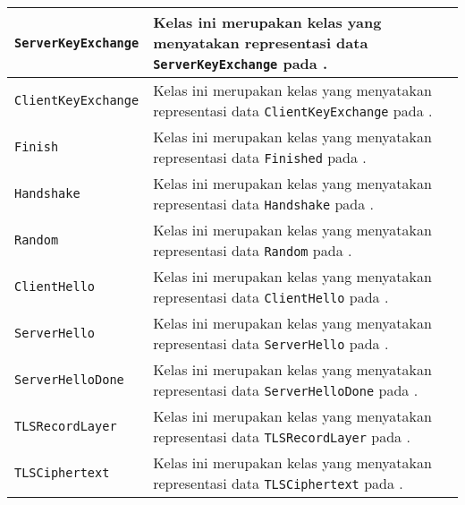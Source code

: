 \begin{longtable}{|p{3.5cm}|p{9cm}|}
    \texttt{ServerKeyExchange} & Kelas ini merupakan kelas yang menyatakan representasi data \texttt{ServerKeyExchange} pada \textcite{rfc5246}.\\ \hline
    \texttt{ClientKeyExchange} & Kelas ini merupakan kelas yang menyatakan representasi data \texttt{ClientKeyExchange} pada \textcite{rfc5246}.\\ \hline
    \texttt{Finish} & Kelas ini merupakan kelas yang menyatakan representasi data \texttt{Finished} pada \textcite{rfc5246}.\\ \hline
    \texttt{Handshake} & Kelas ini merupakan kelas yang menyatakan representasi data \texttt{Handshake} pada \textcite{rfc5246}.\\ \hline
    \texttt{Random} & Kelas ini merupakan kelas yang menyatakan representasi data \texttt{Random} pada \textcite{rfc5246}.\\ \hline
    \texttt{ClientHello} & Kelas ini merupakan kelas yang menyatakan representasi data \texttt{ClientHello} pada \textcite{rfc5246}.\\ \hline
    \texttt{ServerHello} & Kelas ini merupakan kelas yang menyatakan representasi data \texttt{ServerHello} pada \textcite{rfc5246}.\\ \hline
    \texttt{ServerHelloDone} & Kelas ini merupakan kelas yang menyatakan representasi data \texttt{ServerHelloDone} pada \textcite{rfc5246}.\\ \hline
    \texttt{TLSRecordLayer} & Kelas ini merupakan kelas yang menyatakan representasi data \texttt{TLSRecordLayer} pada \textcite{rfc5246}.\\ \hline
    \texttt{TLSCiphertext} & Kelas ini merupakan kelas yang menyatakan representasi data \texttt{TLSCiphertext} pada \textcite{rfc5246}.\\ \hline
\end{longtable}

